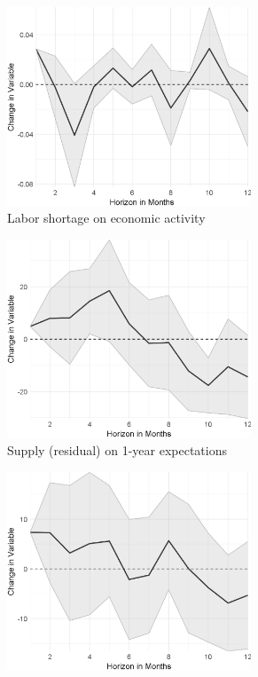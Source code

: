 \begin{figure}
\begin{subfigure}{00.24\textwidth}
		\includegraphics[width=0.8\textwidth]{output/lp/baseline/bHP/labor_shortage/labor_shortageoneconac_djn.eps}
		\caption{Labor shortage on economic activity}
	\end{subfigure}
		\begin{subfigure}{00.24\textwidth}
		\includegraphics[width=0.8\textwidth]{output/lp/baseline/bHP/supply/supplyonexpectations1y_djn.eps}
		\caption{Supply (residual) on 1-year expectations}
	\end{subfigure}
	\begin{subfigure}{00.24\textwidth}
		\includegraphics[width=0.8\textwidth]{output/lp/baseline/bHP/supply/supplyonexpectations3y_djn.eps}

\end{subfigure}
\end{figure}
